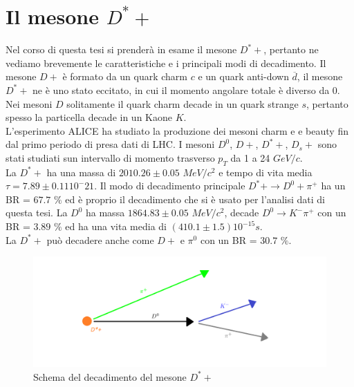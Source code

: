 \section{Il mesone $D^*+$}
Nel corso di questa tesi si prenderà in esame il mesone $D^*+$, pertanto ne vediamo brevemente le caratteristiche e i principali modi di decadimento. Il mesone $D+$ è formato da un quark charm $c$ e un quark anti-down $\overline{d}$, il mesone $D^*+$ ne è uno stato eccitato, in cui il momento angolare totale è diverso da 0. Nei mesoni $D$ solitamente il quark charm decade in un quark strange $s$, pertanto spesso la particella decade in un Kaone $K$. 
\\L'esperimento ALICE ha studiato la produzione dei mesoni charm e e beauty fin dal primo periodo di presa dati di LHC. I mesoni $D^0$, $D+$, $D^*+$, $D_s+$  sono stati studiati sun intervallo di momento trasverso $p_T$ da 1 a 24 $GeV/c$.  \cite{mesoniD}
\\La $D^*+$ ha una massa di $2010.26 \pm 0.05$ $MeV/c^2$ e tempo di vita media $ \tau = 7.89 \pm 0.11 {10^-21}$. Il modo di decadimento principale $D^*+ \rightarrow D^0 + \pi^+ $ ha un BR = $67.7$ $\% $ ed è proprio il decadimento che si è usato per l'analisi dati di questa tesi. La $D^0$ ha massa $ 1864.83 \pm 0.05 $ $MeV/c^2$, decade $D^0 \rightarrow K^- \pi^+$ con un BR = $3.89$ $\%$ ed ha una vita media di $(410.1 \pm 1.5 ) 10^{-15} s $.
\\La $D^*+$ può decadere anche come $D+$ e $\pi^0$ con un BR = $30.7$ $\%$. \cite{PDG}

\begin{figure}[htbp]
        \centering
        \includegraphics[width=1.0\linewidth]{introParticelle/decadimentoD.png}
        \caption{ Schema del decadimento del mesone $D^*+$}
        \label{fig:decadimentoD}
    \end{figure}









